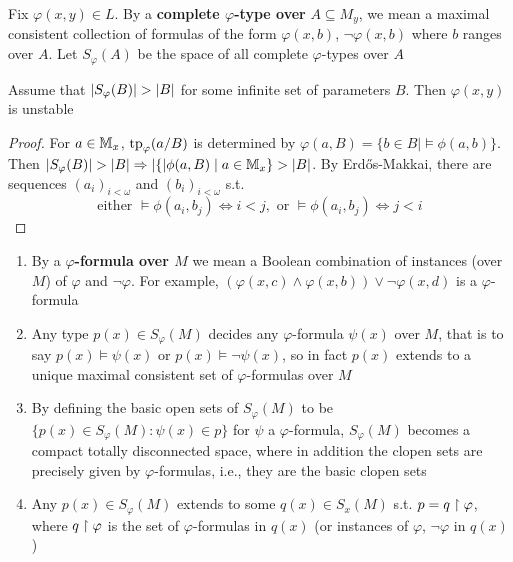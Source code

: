 \documentclass[11pt]{article}
\begin{document}
\begin{definition}[]
Fix \(\varphi(x,y)\in L\). By a \textbf{complete \(\varphi\)-type over} \(A\subseteq M_y\), we mean a maximal consistent collection
of formulas of the form \(\varphi(x,b)\), \(\neg\varphi(x,b)\) where \(b\) ranges over \(A\). Let \(S_\varphi(A)\) be
the space of all complete \(\varphi\)-types over \(A\)
\end{definition}


\begin{proposition}[]
\label{C2.2.13}
Assume that \(\abs{S_\varphi(B)}>\abs{B}\) for some infinite set of parameters \(B\). Then \(\varphi(x,y)\)
is unstable
\end{proposition}

\begin{proof}
For \(a\in\mathbb{M}_x\), \(\operatorname{tp}_\varphi(a/B)\) is determined by \(\varphi(a,B)=\{b\in B\mid\vDash\phi(a,b)\}\). Then
\(\abs{S_\varphi(B)}>\abs{B}\Rightarrow\abs\{\phi(a,B)\mid a\in\M_x\}>\abs{B}\). By Erdős-Makkai, there are
sequences \((a_i)_{i<\omega}\) and \((b_i)_{i<\omega}\) s.t.
\begin{equation*}
\text{either }\vDash\phi(a_i,b_j)\Leftrightarrow i<j,\text{ or }\vDash\phi(a_i,b_j)\Leftrightarrow j<i
\end{equation*}
\end{proof}

\begin{remark}
\begin{enumerate}
\item By a \textbf{\(\varphi\)-formula over \(M\)} we mean a Boolean combination of instances (over \(M\)) of
\(\varphi\) and \(\neg\varphi\). For example, \((\varphi(x,c)\wedge\varphi(x,b))\vee\neg\varphi(x,d)\) is a \(\varphi\)-formula
\item Any type \(p(x)\in S_\varphi(M)\) decides any \(\varphi\)-formula \(\psi(x)\) over \(M\), that is to
say \(p(x)\vDash\psi(x)\) or \(p(x)\vDash\neg\psi(x)\), so in fact \(p(x)\) extends to a unique maximal
consistent set of \(\varphi\)-formulas over \(M\)
\item By defining the basic open sets of \(S_\varphi(M)\) to be \(\{p(x)\in S_\varphi(M):\psi(x)\in p\}\) for \(\psi\) a
\(\varphi\)-formula, \(S_\varphi(M)\) becomes a compact totally disconnected space, where in addition the
clopen sets are precisely given by \(\varphi\)-formulas, i.e., they are the basic clopen sets
\item Any \(p(x)\in S_\varphi(M)\) extends to some \(q(x)\in S_x(M)\) s.t. \(p=q\upharpoonright\varphi\), where \(q\upharpoonright\varphi\) is
the set of \(\varphi\)-formulas in \(q(x)\) (or instances of \(\varphi\), \(\neg\varphi\) in \(q(x)\))
\end{enumerate}
\end{remark}
\end{document}
